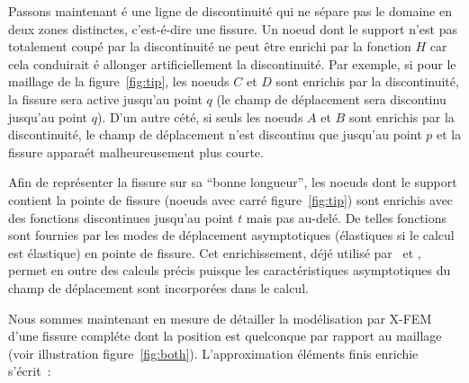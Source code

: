 Passons maintenant \'e une ligne de discontinuit\'e qui ne s\'epare pas le
domaine en deux zones distinctes, c'est-\'e-dire une fissure. Un noeud
dont le support n'est pas totalement coup\'e par la discontinuit\'e
 ne peut \^etre enrichi par la fonction
$H$ car cela conduirait \'e allonger
artificiellement la discontinuit\'e. Par exemple, si pour le maillage
de la figure~\ref{fig:tip}, les noeuds $C$ et $D$ sont enrichis par
la discontinuit\'e, la fissure sera active jusqu'au point $q$ (le
champ de d\'eplacement sera discontinu jusqu'au point $q$). D'un autre
c\'et\'e, si seuls les noeuds $A$ et $B$ sont enrichis par la
discontinuit\'e, le champ de d\'eplacement n'est discontinu que jusqu'au
point $p$ et la fissure appara\'et malheureusement plus courte.

Afin de repr\'esenter la fissure sur sa ``bonne longueur'', les noeuds
dont le support contient la pointe de fissure (noeuds avec carr\'e figure~\ref{fig:tip}) sont enrichis avec
des fonctions discontinues jusqu'au point $t$ mais pas au-del\'e. De
telles fonctions sont fournies par les modes de d\'eplacement
asymptotiques (\'elastiques si le calcul est
\'elastique) en pointe de fissure. Cet
enrichissement, d\'ej\'e utilis\'e
par~\cite{TBlack:minim} et \cite{Stroub:GFEM1}, permet en outre des
calculs pr\'ecis puisque les caract\'eristiques asymptotiques du champ
de d\'eplacement sont incorpor\'ees dans le calcul.



Nous sommes maintenant en mesure de d\'etailler la mod\'elisation par X-FEM
d'une fissure compl\'ete dont la position est quelconque par rapport au maillage
(voir illustration figure~\ref{fig:both}). L'approximation \'el\'ements finis enrichie s'\'ecrit~:

